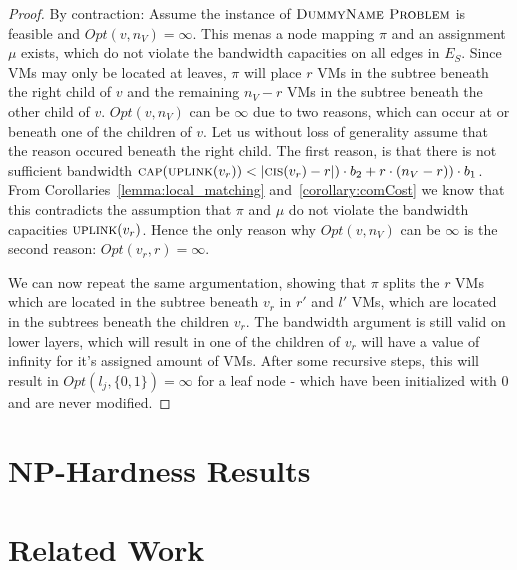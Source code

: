 \documentclass[9pt,twocolumn]{scrartcl}
\newcommand{\Capacity}{\ensuremath{\textsc{cap}}}
\newcommand{\Problem}{\textsc{DummyName Problem}}
\newcommand{\VmChunkAssignment}{\mu}
\newcommand{\NodeMapping}{\pi}
\newcommand{\SubstrateEdges}{\ensuremath{E_S}}
\newcommand{\SubstrateNode}{\ensuremath{v}}
\newcommand{\Leaf}{\ensuremath{l}}
\newcommand{\Opt}{\ensuremath{Opt}}
\newcommand{\Uplink}{\ensuremath{\textsc{uplink}}}
\newcommand{\ChunkCount}{\ensuremath{\textsc{cis}}}
\newcommand{\CostCom}{\ensuremath{b_1}}
\newcommand{\CostTrans}{\ensuremath{b_2}}
\newcommand{\Vms}{\ensuremath{n_V}}
\begin{document}
\begin{proof}
By contraction: Assume the instance of $\Problem$ is feasible and
$\Opt(\SubstrateNode,\Vms) = \infty$. This menas a node mapping $\NodeMapping$
and an assignment $\VmChunkAssignment$ exists, which do not violate the
bandwidth capacities on all edges in $\SubstrateEdges$. Since VMs may only be
located at leaves, $\NodeMapping$ will place $r$ VMs in the subtree beneath the
right child of $\SubstrateNode$ and the remaining $\Vms - r$ VMs in the subtree
beneath the other child of $\SubstrateNode$.
$\Opt(\SubstrateNode,\Vms)$ can be $\infty$ due to two reasons, which can occur
at or beneath one of the children of $\SubstrateNode$. Let us without loss of
generality assume that the reason occured beneath the right child. The first
reason, is that there is not sufficient bandwidth
$\Capacity(\Uplink(\SubstrateNode_r)) < |\ChunkCount(\SubstrateNode_{r}) - r|)
\cdot \CostTrans + r \cdot (\Vms - r)) \cdot \CostCom$. From
Corollaries~\ref{lemma:local_matching} and~\ref{corollary:comCost} we know
that this contradicts the assumption that $\NodeMapping$
and $\VmChunkAssignment$ do not violate the bandwidth capacities
$\Uplink(\SubstrateNode_r)$. Hence the only reason why
$\Opt(\SubstrateNode,\Vms)$ can be $\infty$ is the second reason:
$\Opt(\SubstrateNode_r, r) = \infty$.

We can now repeat the same argumentation, showing that $\NodeMapping$ splits
the $r$ VMs which are located in the subtree beneath $\SubstrateNode_r$ in $r'$
and $l'$ VMs, which are located in the subtrees beneath the
children $\SubstrateNode_r$. The bandwidth argument is still valid on lower
layers, which will result in one of the children of $\SubstrateNode_r$ will
have a value of infinity for it's assigned amount of VMs. After some
recursive steps, this will result in $\Opt(\Leaf_j, \{0,1\}) = \infty$
for a leaf node - which have been initialized with $0$ and
are never modified.
\end{proof}

\section{NP-Hardness Results}\label{sec:np}




\section{Related Work}\label{sec:relwork}
\end{document}
